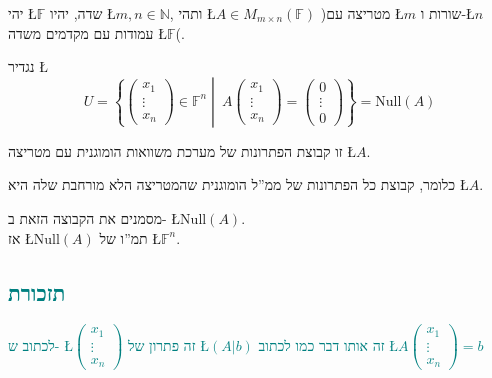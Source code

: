 \documentclass[english,hebrew]{article}
\begin{document}
יהי \L{$\mathbb{F}$} שדה, יהיו \L{$m,n\in\mathbb{N}$}, ותהי \L{$A\in M_{m\times n}(\mathbb{F})$}
)מטריצה עם \L{$m$} שורות ו-\L{$n$} עמודות עם מקדמים משדה \L{$\mathbb{F}$}(.

נגדיר \L{%
\[
U=\left\{ \begin{pmatrix}x_{1}\\
\vdots\\
x_{n}
\end{pmatrix}\in\mathbb{F}^{n}\middle|\:A\begin{pmatrix}x_{1}\\
\vdots\\
x_{n}
\end{pmatrix}=\begin{pmatrix}0\\
\vdots\\
0
\end{pmatrix}\right\} =\text{Null}(A)
\]
}%

זו קבוצת הפתרונות של מערכת משוואות הומוגנית עם מטריצה \L{$A$}.

כלומר, קבוצת כל הפתרונות של ממ\textquotedblright ל הומוגנית שהמטריצה
הלא מורחבת שלה היא \L{$A$}.

מסמנים את הקבוצה הזאת ב- \L{$\text{Null}(A)$}. \\

אז \L{$\text{Null}(A)$} תמ\textquotedblright ו של \L{$\mathbb{F}^{n}$}.

\subsection{\textcolor{teal}{תזכורת}}

\textcolor{teal}{לכתוב ש- \L{$\begin{pmatrix}x_{1}\\
\vdots\\
x_{n}
\end{pmatrix}$} זה פתרון של \L{$(A|b)$} זה אותו דבר כמו לכתוב \L{$A\begin{pmatrix}x_{1}\\
\vdots\\
x_{n}
\end{pmatrix}=b$}}
\end{document}
